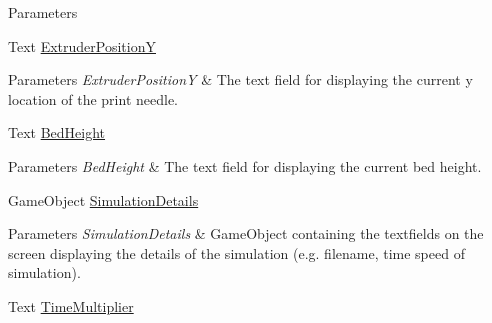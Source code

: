 \begin{DoxyCompactItemize}
\begin{DoxyCompactList}
\begin{DoxyParams}{Parameters}
\hline
\end{DoxyParams}
\end{DoxyCompactList}\item 
\mbox{\label{class_u_i_controller_a504b3ba6c916c43baba0df947dae89b5}} 
Text \hyperlink{class_u_i_controller_a504b3ba6c916c43baba0df947dae89b5}{Extruder\+PositionY}
\begin{DoxyCompactList}\small\item\em 
\begin{DoxyParams}{Parameters}
{\em Extruder\+PositionY} & The text field for displaying the current y location of the print needle.\\
\hline
\end{DoxyParams}
\end{DoxyCompactList}\item 
\mbox{\label{class_u_i_controller_a49baeb13cde303094921023dbaa34910}} 
Text \hyperlink{class_u_i_controller_a49baeb13cde303094921023dbaa34910}{Bed\+Height}
\begin{DoxyCompactList}\small\item\em 
\begin{DoxyParams}{Parameters}
{\em Bed\+Height} & The text field for displaying the current bed height.\\
\hline
\end{DoxyParams}
\end{DoxyCompactList}\item 
\mbox{\label{class_u_i_controller_a08a3a7a00bc7bac76ac726a3735532eb}} 
Game\+Object \hyperlink{class_u_i_controller_a08a3a7a00bc7bac76ac726a3735532eb}{Simulation\+Details}
\begin{DoxyCompactList}\small\item\em 
\begin{DoxyParams}{Parameters}
{\em Simulation\+Details} & Game\+Object containing the textfields on the screen displaying the details of the simulation (e.\+g. filename, time speed of simulation).\\
\hline
\end{DoxyParams}
\end{DoxyCompactList}\item 
\mbox{\label{class_u_i_controller_a2f5c3c69e83435b9b4c3a9cb5f3a75af}} 
Text \hyperlink{class_u_i_controller_a2f5c3c69e83435b9b4c3a9cb5f3a75af}{Time\+Multiplier}

\end{DoxyCompactItemize}

